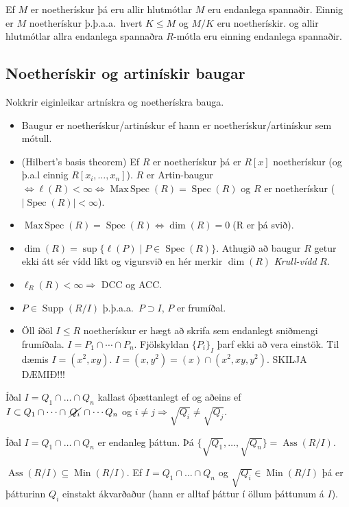 \documentclass[a4paper, 14pt]{article}
\DeclareMathOperator{\Spec}{Spec}
\DeclareMathOperator{\Ass}{Ass}
\DeclareMathOperator{\Supp}{Supp}
\DeclareMathOperator{\Min}{Min}
\DeclareMathOperator{\MaxSpec}{Max\, Spec}
\newcommand{\then}{\Longrightarrow}
\begin{document}
Ef $M$ er noetherískur þá eru allir hlutmótlar $M$ eru endanlega spannaðir. Einnig er $M$ noetherískur 
þ.þ.a.a.\ hvert $K \leq M$ og $M/K$ eru noetherískir. og allir hlutmótlar allra endanlega spannaðra $R$-mótla eru 
einning endanlega spannaðir.

\subsection{Noetherískir og artinískir baugar}
Nokkrir eiginleikar artnískra og noetherískra bauga.
\begin{itemize}
\item Baugur er noetherískur/artinískur ef hann er noetherískur/artinískur
sem mótull. 
\item (Hilbert's basis theorem) Ef $R$ er noetherískur þá er $R[x]$ noetherískur (og þ.a.l einnig $R[x_i, \dots, x_n]$).
$R$ er Artin-baugur $\iff \ell(R) < \infty \iff \MaxSpec(R) = \Spec(R)$ og $R$ er noetherískur ($|\Spec(R)| < \infty$).

\item $\MaxSpec(R) = \Spec(R) \iff \dim(R) = 0 \; $(R er þá svið).

\item $\dim(R) = \sup \{ \ell(P) \mid P \in \Spec(R) \}$.
Athugið að baugur $R$ getur ekki átt sér vídd líkt og vigursvið en hér merkir
$\dim(R)$ \emph{Krull-vídd} $R$.

\item $\ell_R(R) < \infty \then$ DCC og ACC.

\item $P \in \Supp(R/I)$ þ.þ.a.a.\ $P \supset I$, $P$ er frumíðal.

\item Öll íðöl $I \leq R$ noetherískur er hægt að skrifa sem endanlegt sniðmengi frumíðala.
$I = P_1 \cap \cdots \cap P_n$. Fjölskyldan $\{ P_i \}_I$ þarf ekki að vera einstök.
Til dæmis $I = (x^2, xy)$. $I = (x, y^2) = (x) \cap (x^2, xy, y^2).$
SKILJA DÆMIÐ!!!

\end{itemize}

Íðal $I = Q_1 \cap \dots \cap Q_n$ kallast óþættanlegt ef og aðeins ef 
$I \subset Q_1 \cap \dots \cap \, \cancel{Q_i} \, \cap \cdots Q_n$ og $i \neq j \then \sqrt{Q_i} \neq \sqrt{Q_j}$.

Íðal $I = Q_1 \cap \dots \cap Q_n$ er endanleg þáttun. Þá $\{ \sqrt{Q_1}, \dots, \sqrt{Q_n} \} = \Ass(R/I).$

$\Ass(R/I) \subseteq \Min(R/I)$.
Ef $I = Q_1 \cap \dots \cap Q_n$ og $\sqrt{Q_i} \in \Min(R/I)$ þá
er þátturinn $Q_i$ einstakt ákvarðaður (hann er alltaf þáttur í öllum
þáttunum á $I$).
\end{document}
